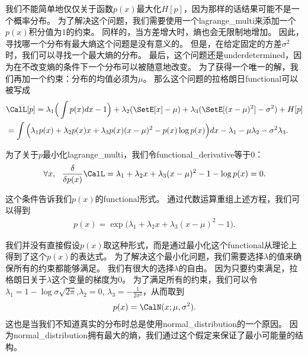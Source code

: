 我们不能简单地仅仅关于函数$p(x)$最大化$H[p]$，因为那样的话结果可能不是一个概率分布。
为了解决这个问题，我们需要使用一个\gls{lagrange_multi}来添加一个$p(x)$积分值为$1$的约束。
同样的，当方差增大时，熵也会无限制地增加。
因此，寻找哪一个分布有最大熵这个问题是没有意义的。
但是，在给定固定的方差$\sigma^2$时，我们可以寻找一个最大熵的分布。
最后，这个问题还是\gls{underdetermined}，因为在不改变熵的条件下一个分布可以被随意地改变。
为了获得一个唯一的解，我们再加一个约束：分布的均值必须为$\mu$。
那么这个问题的拉格朗日\gls{functional}可以被写成
\begin{align}
\label{eqn:1950}
&		\CalL[p] =  \lambda_1 \Big(\int p(x)dx - 1\Big)  + \lambda_2 (\SetE[x] - \mu) +  \lambda_3 (\SetE[(x-\mu)^2] - \sigma^2)  + H[p]\\
& =  \int \Big(\lambda_1 p(x) + \lambda_2 p(x)x + \lambda_3 p(x)(x-\mu)^2 - p(x)\log p(x) \Big)dx - \lambda_1 - \mu \lambda_2 - \sigma^2\lambda_3.
\end{align}


为了关于$p$最小化\gls{lagrange_multi}，我们令\gls{functional_derivative}等于$0$：
\begin{align}
\label{eqn:1952}
	\forall x,\ \  \frac{\delta}{\delta p(x)} \CalL = \lambda_1 + \lambda_2 x + \lambda_3(x-\mu)^2 - 1 - \log p(x) = 0 .
\end{align}


这个条件告诉我们$p(x)$的\gls{functional}形式。
通过代数运算重组上述方程，我们可以得到
\begin{align}
\label{eqn:1953}
	p(x) = \exp\big(\lambda_1 + \lambda_2 x + \lambda_3 (x-\mu)^2  - 1\big).
\end{align}


我们并没有直接假设$p(x)$取这种形式，而是通过最小化这个\gls{functional}从理论上得到了这个$p(x)$的表达式。
为了解决这个最小化问题，我们需要选择$\lambda$的值来确保所有的约束都能够满足。
我们有很大的选择$\lambda$的自由。
因为只要约束满足，拉格朗日关于$\lambda$这个变量的梯度为$0$。
为了满足所有的约束，我们可以令$\lambda_1 = 1 - \log \sigma\sqrt{2\pi}$,$\lambda_2 = 0$, $\lambda_3 = - \frac{1}{2\sigma^2}$，从而取到
\begin{align}
\label{eqn:1954}
	p(x) = \CalN(x;\mu,\sigma^2).
\end{align}
这也是当我们不知道真实的分布时总是使用\gls{normal_distribution}的一个原因。
因为\gls{normal_distribution}拥有最大的熵，我们通过这个假定来保证了最小可能量的结构。



